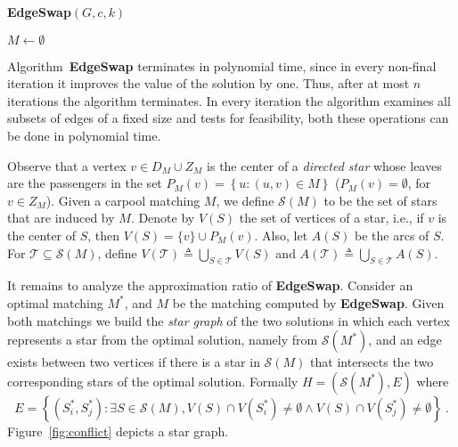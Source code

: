 \documentclass[11pt]{article}
\newcommand{\set}[1]{\left\{ #1 \right\}}
\newcommand{\eqdf}{\triangleq}
\def\N{\mathbb{N}}
\newcommand{\calS}{\mathcal{S}}
\newcommand{\calT}{\mathcal{T}}
\begin{document}
\begin{algorithm}
\caption{\textbf{EdgeSwap}$(G,c,k)$}
\label{alg:local}
$M \leftarrow \emptyset$								\\
\end{algorithm}

Algorithm~\textbf{EdgeSwap} terminates in polynomial time, since in
every non-final iteration it improves the value of the solution by
one.  Thus, after at most $n$ iterations the algorithm terminates.  In
every iteration the algorithm examines all subsets of edges of a fixed
size and tests for feasibility, both these operations can be done in
polynomial time.

Observe that a vertex $v \in D_M \cup Z_M$ is the center of
a \emph{directed star} whose leaves are the passengers in the set
$P_M(v) = \set{u : (u,v) \in M}$
($P_M(v) = \emptyset$, for $v \in Z_M$).
%
Given a carpool matching $M$, we define $\calS(M)$ to be the set of
stars that are induced by $M$.  Denote by $V(S)$ the set of vertices
of a star, i.e., if $v$ is the center of $S$, then $V(S) = \{v\} \cup
P_M(v)$.  Also, let $A(S)$ be the arcs of $S$.  For
$\calT \subseteq \calS(M)$, define
$V(\calT) \eqdf \bigcup_{S \in \calT} V(S)$ and
$A(\calT) \eqdf \bigcup_{S \in \calT} A(S)$.

It remains to analyze the approximation ratio of \textbf{EdgeSwap}.
Consider an optimal matching $M^*$, and $M$ be the matching computed
by \textbf{EdgeSwap}.  Given both matchings we build the \emph{star
  graph} of the two solutions in which each vertex represents a star
from the optimal solution, namely from $\calS(M^*)$, and an edge
exists between two vertices if there is a star in $\calS(M)$ that
intersects the two corresponding stars of the optimal solution.
%
Formally $H = (\calS(M^*), E)$ where
\[
E = \set{(S^*_i, S^*_j) : \exists S \in \calS(M), 
         V(S) \cap V(S^*_i) \neq \emptyset \land
         V(S) \cap V(S^*_j) \neq \emptyset}
~.
\]
Figure~\ref{fig:conflict} depicts a star graph.
\end{document}
